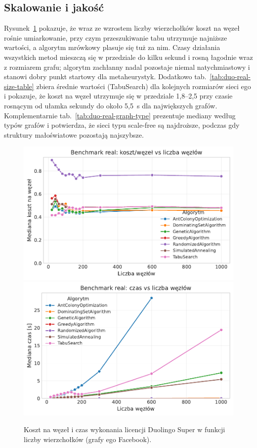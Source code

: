\subsection{Skalowanie i jakość}

Rysunek~\ref{fig:duo-real-size} pokazuje, że wraz ze wzrostem liczby wierzchołków koszt na węzeł rośnie umiarkowanie, przy czym przeszukiwanie tabu utrzymuje najniższe wartości, a algorytm mrówkowy plasuje się tuż za nim. Czasy działania wszystkich metod mieszczą się w przedziale do kilku sekund i rosną łagodnie wraz z rozmiarem grafu; algorytm zachłanny nadal pozostaje niemal natychmiastowy i stanowi dobry punkt startowy dla metaheurystyk. Dodatkowo tab.~\ref{tab:duo-real-size-table} zbiera średnie wartości (TabuSearch) dla kolejnych rozmiarów sieci ego i pokazuje, że koszt na węzeł utrzymuje się w przedziale 1{,}8--2{,}5 przy czasie rosnącym od ułamka sekundy do około 5{,}5~s dla największych grafów. Komplementarnie tab.~\ref{tab:duo-real-graph-type} prezentuje mediany według typów grafów i potwierdza, że sieci typu scale-free są najdroższe, podczas gdy struktury małoświatowe pozostają najszybsze.

\begin{figure}[H]
  \centering
  \includegraphics[width=0.48\linewidth]{assets/figures/benchmark/real/cost_per_node_vs_nodes.pdf}
  \hfill
  \includegraphics[width=0.48\linewidth]{assets/figures/benchmark/real/time_vs_nodes.pdf}
  \caption{Koszt na węzeł i czas wykonania licencji Duolingo Super w funkcji liczby wierzchołków (grafy ego Facebook).}
  \label{fig:duo-real-size}
\end{figure}

